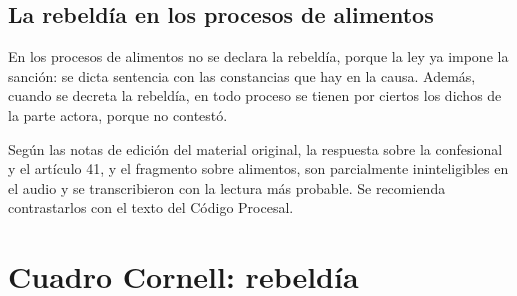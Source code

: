 \documentclass[12pt,oneside]{book}
\begin{document}
\subsection{La rebeld\'ia en los procesos de alimentos}

En los procesos de alimentos no se declara la rebeld\'ia, porque la ley ya impone la sanci\'on: se dicta sentencia con las constancias que hay en la causa. Adem\'as, cuando se decreta la rebeld\'ia, en todo proceso se tienen por ciertos los dichos de la parte actora, porque no contest\'o.


\begin{note}
Seg\'un las notas de edici\'on del material original, la respuesta sobre la confesional y el art\'iculo 41, y el fragmento sobre alimentos, son parcialmente ininteligibles en el audio y se transcribieron con la lectura m\'as probable. Se recomienda contrastarlos con el texto del C\'odigo Procesal.
\end{note}

\section{Cuadro Cornell: rebeld\'ia}
\end{document}
